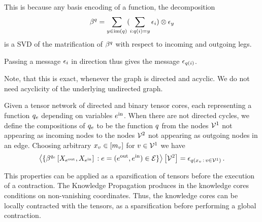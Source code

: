 This is because any basis encoding of a function, the decomposition
\begin{align*}
	\beta^{q} = \sum_{y \in\mathrm{im}\left(q\right)} ( \sum_{i: q(i)=y}\epsilon_{i} )  \otimes \epsilon_{y}
\end{align*}
is a SVD of the matrification of $\beta^{q}$ with respect to incoming and outgoing legs.


Passing a message $\epsilon_{i}$ in direction thus gives the message $\epsilon_{q(i)}$.

Note, that this is exact, whenever the graph is directed and acyclic.
We do not need acyclicity of the underlying undirected graph.



\begin{remark}
	Given a tensor network of directed and binary tensor cores, each representing a function $q_{e}$ depending on variables $e^{\mathrm{in}}$.
	When there are not directed cycles, we define the compositions of $q_{e}$ to be the function $q$ from the nodes $\mathcal{V}^{1}$ not appearing as incoming nodes to the nodes $\mathcal{V}^{2}$ not appearing as outgoing nodes in an edge.
	Choosing arbitrary $x_{v}\in[m_{v}]$ for $v\in\mathcal{V}^{1}$ we have
	\begin{align*}
		\left\langle \{\beta^{q_{e}}\left[X_{e^{\mathrm{out}}},X_{e^{\mathrm{in}}}\right] \, : e=(e^{\mathrm{out}},e^{\mathrm{in}})\in\mathcal{E}\}\right\rangle \left[ \mathcal{V}^{2} \right]
	= \epsilon_{q(x_{v} \,:\, v\in\mathcal{V}^{1})}\, .
	\end{align*}
\end{remark}




This properties can be applied as a sparsification of tensors before the execution of a contraction.
The Knowledge Propagation  produces in the knowledge cores conditions on non-vanishing coordinates.
Thus, the knowledge cores can be locally contracted with the tensors, as a sparsification before performing a global contraction.






